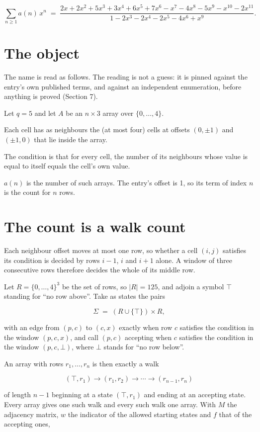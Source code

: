 \documentclass[11pt]{article}
\theoremstyle{definition}
\begin{document}
\[\sum_{n \ge 1} a(n)\,x^n \;=\; \frac{2x + 2x^{2} + 5x^{3} + 3x^{4} + 6x^{5} + 7x^{6} - x^{7} - 4x^{8} - 5x^{9} - x^{10} - 2x^{11}}{1 - 2x^{3} - 2x^{4} - 2x^{5} - 4x^{6} + x^{9}}.\]

\section{The object}

The name is read as follows. The reading is not a guess: it is pinned against the entry's own published terms, and against an independent enumeration, before anything is proved (Section 7).

Let $q = 5$ and let $A$ be an $n \times 3$ array over $\{0,\dots,4\}$.

Each cell has as neighbours the (at most four) cells at offsets $(0,\pm1)$ and $(\pm1,0)$ that lie inside the array.

The condition is that for every cell, the number of its neighbours whose value is equal to itself equals the cell's own value.

$a(n)$ is the number of such arrays. The entry's offset is 1, so its term of index $n$ is the count for $n$ rows.

\section{The count is a walk count}

Each neighbour offset moves at most one row, so whether a cell $(i,j)$ satisfies its condition is decided by rows $i-1$, $i$ and $i+1$ alone. A window of three consecutive rows therefore decides the whole of its middle row.

Let $R = \{0,\dots,4\}^{3}$ be the set of rows, so $|R| = 125$, and adjoin a symbol $\top$ standing for ``no row above''. Take as states the pairs

\[\Sigma \;=\; (R \cup \{\top\}) \times R,\]

with an edge from $(p,c)$ to $(c,x)$ exactly when row $c$ satisfies the condition in the window $(p,c,x)$, and call $(p,c)$ accepting when $c$ satisfies the condition in the window $(p,c,\bot)$, where $\bot$ stands for ``no row below''.

An array with rows $r_1,\dots,r_n$ is then exactly a walk

\[(\top,r_1) \to (r_1,r_2) \to \cdots \to (r_{n-1},r_n)\]

of length $n-1$ beginning at a state $(\top,r_1)$ and ending at an accepting state. Every array gives one such walk and every such walk one array. With $M$ the adjacency matrix, $w$ the indicator of the allowed starting states and $f$ that of the accepting ones,
\end{document}
